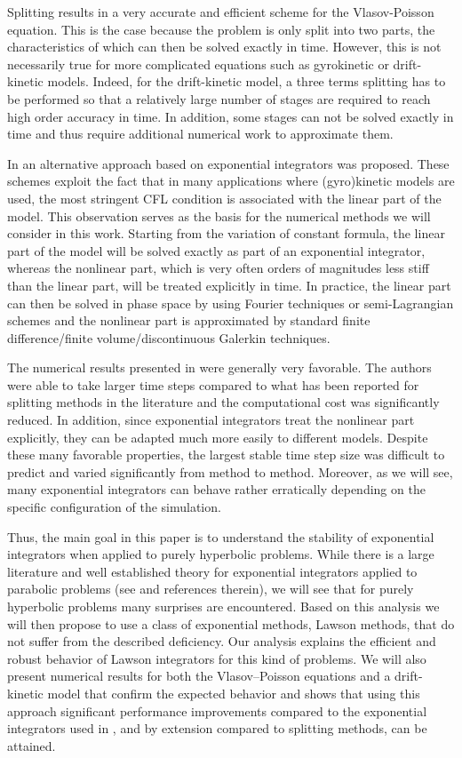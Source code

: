 Splitting results in a very accurate and efficient scheme for the Vlasov-Poisson equation. This is the case because the problem is only split into two parts, the characteristics of which can then be solved exactly in time.  However, this is not necessarily true for more complicated equations such as gyrokinetic or drift-kinetic models. Indeed, for the drift-kinetic model, a three terms splitting has to be performed so that a relatively large number of stages are required to reach high order accuracy in time.  In addition, some stages can not be solved exactly in time and thus require additional numerical work to approximate them.

In \cite{Crouseilles:2018} an alternative approach based on exponential integrators was proposed. These schemes exploit the fact that in many applications where (gyro)kinetic models are used, the most stringent CFL condition is associated with the linear part of the model. This observation serves as the basis for the numerical methods we will consider in this work. Starting from the variation of constant formula, the linear part of the model will be solved exactly as part of an exponential integrator, whereas the nonlinear part, which is very often orders of magnitudes less stiff than the linear part, will be treated explicitly in time. In practice, the linear part can then be solved in phase space by using Fourier techniques or semi-Lagrangian schemes and the nonlinear part is approximated by standard finite difference/finite volume/discontinuous Galerkin techniques. 

The numerical results presented in \cite{Crouseilles:2018} were generally very favorable. The authors were able to take larger time steps compared to what has been reported for splitting methods in the literature and the computational cost was significantly reduced. In addition, since exponential integrators treat the nonlinear part explicitly, they can be adapted much more easily to different models. Despite these many favorable properties, the largest stable time step size was difficult to predict and varied significantly from method to method. Moreover, as we will see, many exponential integrators can behave rather erratically depending on the specific configuration of the simulation.

Thus, the main goal in this paper is to understand the stability of exponential integrators when applied to purely hyperbolic problems. While there is a large literature and well established theory for exponential integrators applied to parabolic problems (see \cite{Hochbruck:2010} and references therein), we will see that for purely hyperbolic problems many surprises are encountered. Based on this analysis we will then propose to use a class of exponential methods, Lawson methods, that do not suffer from the described deficiency. Our analysis explains the efficient and robust behavior of Lawson integrators for this kind of problems. We will also present numerical results for both the Vlasov--Poisson equations and a drift-kinetic model that confirm the expected behavior and shows that using this approach significant performance improvements compared to the exponential integrators used in \cite{Crouseilles:2018}, and by extension compared to splitting methods, can be attained.

